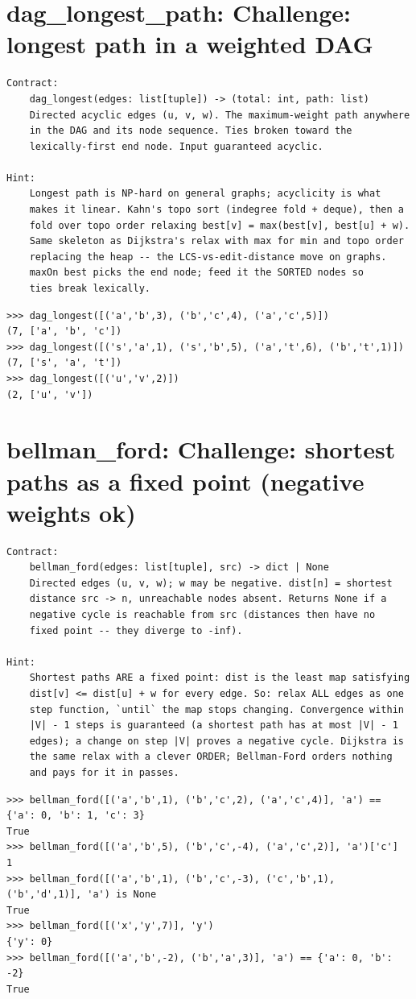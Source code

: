 \documentclass[10pt,letterpaper]{book}
\begin{document}
\section{dag\_longest\_path: Challenge: longest path in a weighted DAG}
\begin{lstlisting}[style=ex]
Contract:
    dag_longest(edges: list[tuple]) -> (total: int, path: list)
    Directed acyclic edges (u, v, w). The maximum-weight path anywhere
    in the DAG and its node sequence. Ties broken toward the
    lexically-first end node. Input guaranteed acyclic.

Hint:
    Longest path is NP-hard on general graphs; acyclicity is what
    makes it linear. Kahn's topo sort (indegree fold + deque), then a
    fold over topo order relaxing best[v] = max(best[v], best[u] + w).
    Same skeleton as Dijkstra's relax with max for min and topo order
    replacing the heap -- the LCS-vs-edit-distance move on graphs.
    maxOn best picks the end node; feed it the SORTED nodes so
    ties break lexically.
\end{lstlisting}
\begin{lstlisting}[style=ex]
>>> dag_longest([('a','b',3), ('b','c',4), ('a','c',5)])
(7, ['a', 'b', 'c'])
>>> dag_longest([('s','a',1), ('s','b',5), ('a','t',6), ('b','t',1)])
(7, ['s', 'a', 't'])
>>> dag_longest([('u','v',2)])
(2, ['u', 'v'])
\end{lstlisting}

\section{bellman\_ford: Challenge: shortest paths as a fixed point (negative weights ok)}
\begin{lstlisting}[style=ex]
Contract:
    bellman_ford(edges: list[tuple], src) -> dict | None
    Directed edges (u, v, w); w may be negative. dist[n] = shortest
    distance src -> n, unreachable nodes absent. Returns None if a
    negative cycle is reachable from src (distances then have no
    fixed point -- they diverge to -inf).

Hint:
    Shortest paths ARE a fixed point: dist is the least map satisfying
    dist[v] <= dist[u] + w for every edge. So: relax ALL edges as one
    step function, `until` the map stops changing. Convergence within
    |V| - 1 steps is guaranteed (a shortest path has at most |V| - 1
    edges); a change on step |V| proves a negative cycle. Dijkstra is
    the same relax with a clever ORDER; Bellman-Ford orders nothing
    and pays for it in passes.
\end{lstlisting}
\begin{lstlisting}[style=ex]
>>> bellman_ford([('a','b',1), ('b','c',2), ('a','c',4)], 'a') == {'a': 0, 'b': 1, 'c': 3}
True
>>> bellman_ford([('a','b',5), ('b','c',-4), ('a','c',2)], 'a')['c']
1
>>> bellman_ford([('a','b',1), ('b','c',-3), ('c','b',1), ('b','d',1)], 'a') is None
True
>>> bellman_ford([('x','y',7)], 'y')
{'y': 0}
>>> bellman_ford([('a','b',-2), ('b','a',3)], 'a') == {'a': 0, 'b': -2}
True
\end{lstlisting}
\end{document}
